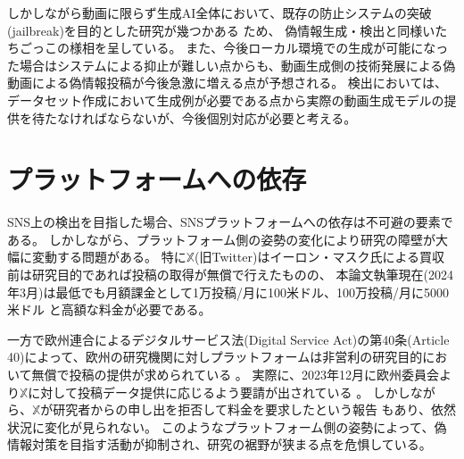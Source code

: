 しかしながら動画に限らず生成AI全体において、既存の防止システムの突破(jailbreak)を目的とした研究が幾つかある \cite{NEURIPS2023_fd661313,shayegani2024jailbreak}ため、
偽情報生成・検出と同様いたちごっこの様相を呈している。
また、今後ローカル環境での生成が可能になった場合はシステムによる抑止が難しい点からも、動画生成側の技術発展による偽動画による偽情報投稿が今後急激に増える点が予想される。
検出においては、データセット作成において生成例が必要である点から実際の動画生成モデルの提供を待たなければならないが、今後個別対応が必要と考える。

\section{プラットフォームへの依存}
SNS上の検出を目指した場合、SNSプラットフォームへの依存は不可避の要素である。
しかしながら、プラットフォーム側の姿勢の変化により研究の障壁が大幅に変動する問題がある。
特に$\mathbb{X}$(旧Twitter)はイーロン・マスク氏による買収前は研究目的であれば投稿の取得が無償で行えたものの、
本論文執筆現在(2024年3月)は最低でも月額課金として1万投稿/月に100米ドル、100万投稿/月に5000米ドル \cite{Twitter}と高額な料金が必要である。

一方で欧州連合によるデジタルサービス法(Digital Service Act)の第40条(Article 40)によって、欧州の研究機関に対しプラットフォームは非営利の研究目的において無償で投稿の提供が求められている \cite{DSA}。
実際に、2023年12月に欧州委員会より$\mathbb{X}$に対して投稿データ提供に応じるよう要請が出されている \cite{order23}。
しかしながら、$\mathbb{X}$が研究者からの申し出を拒否して料金を要求したという報告 \cite{xreject}もあり、依然状況に変化が見られない。
このようなプラットフォーム側の姿勢によって、偽情報対策を目指す活動が抑制され、研究の裾野が狭まる点を危惧している。
